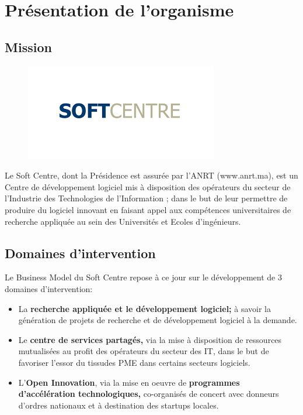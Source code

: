 \documentclass[12pt,a4paper]{report}
\begin{document}
	
	




	\chapter{Présentation de l'organisme}
	\section{Mission}
	\begin{figure}
	\includegraphics[scale=0.5]{./graphics/logo_softcentre.png}
	\end{figure}
		Le Soft Centre, dont la Présidence est assurée par l’ANRT (www.anrt.ma), est un Centre de développement logiciel mis à disposition des opérateurs du secteur de l’Industrie des Technologies de l’Information ; dans le but de leur permettre de produire du logiciel innovant en faisant appel aux compétences universitaires de recherche appliquée au sein des Universités et Ecoles d’ingénieurs.

	
        \section{Domaines d’intervention}
          Le Business Model du Soft Centre repose à ce jour sur le développement de 3 domaines d'intervention:\\
	\begin{itemize}
		\item La \textbf{recherche appliquée et le développement logiciel;} à savoir la génération de projets de recherche et de développement logiciel \guillemotleft à la demande\guillemotright.
		\item Le \textbf{centre de services partagés,} via la mise à disposition de ressources mutualisées au profit des opérateurs du secteur des IT, dans le but de favoriser l'essor du tissudes PME dans certains secteurs logiciels.
		\item L'\textbf{Open Innovation}, via la mise en oeuvre de \textbf{programmes d'accélération technologiques, } co-organisés de concert avec donneurs d'ordres nationaux et à destination des startups locales.
	\end{itemize}
\end{document}
